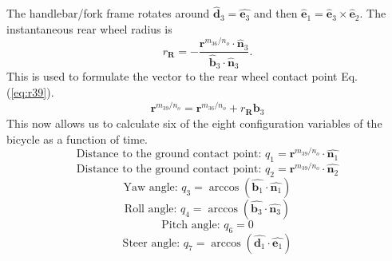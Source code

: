 The handlebar/fork frame rotates around $\hat{\mathbf{d}}_3=\hat{\mathbf{e}_3}$
and then $\hat{\mathbf{e}}_1=\hat{\mathbf{e}}_3\times\hat{\mathbf{e}}_2$. The
instantaneous rear wheel radius is
\begin{equation}
    r_\mathbf{R}=-\frac{\mathbf{r}^{{m_{36}}/{n_o}}\cdot\hat{\mathbf{n}}_3}{\hat{\mathbf{b}}_3\cdot\hat{\mathbf{n}}_3}\textrm{.}
\label{eq:rr}
\end{equation}
This is used to formulate the vector to the rear wheel contact point Eq.
(\ref{eq:r39}).
\begin{equation}
    \mathbf{r}^{{m_{39}}/{n_o}} = \mathbf{r}^{{m_{36}}/{n_o}}+r_\mathbf{R}\hat{\mathbf{b}_3}
\label{eq:r39}
\end{equation}
This now allows us to calculate six of the eight configuration variables of the
bicycle as a function of time.
\begin{equation}
    \textrm{Distance to the ground contact point: }q_1 = \mathbf{r}^{{m_{39}}/{n_o}}\cdot\hat{\mathbf{n}_1}
\label{eq:q1}
\end{equation}
\begin{equation}
    \textrm{Distance to the ground contact point: }q_2 = \mathbf{r}^{{m_{39}}/{n_o}}\cdot\hat{\mathbf{n}_2}
\label{eq:q2}
\end{equation}
\begin{equation}
    \textrm{Yaw angle: }q_3 = \arccos\left(\hat{\mathbf{b}_1}\cdot\hat{\mathbf{n}_1}\right)
\label{eq:q3}
\end{equation}
\begin{equation}
    \textrm{Roll angle: }q_4 = \arccos\left(\hat{\mathbf{b}_3}\cdot\hat{\mathbf{n}_3}\right)
\label{eq:q4}
\end{equation}
\begin{equation}
    \textrm{Pitch angle: }q_6 = 0
\label{eq:q6}
\end{equation}
\begin{equation}
    \textrm{Steer angle: }q_7 = \arccos\left(\hat{\mathbf{d}_1}\cdot\hat{\mathbf{e}_1}\right)
\label{eq:q7}
\end{equation}


